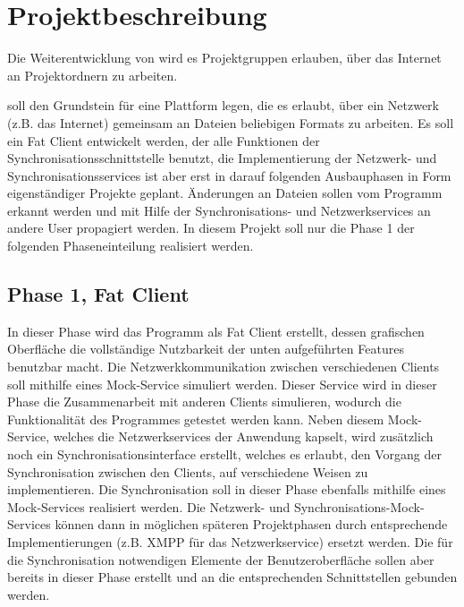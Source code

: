 
\section{Projektbeschreibung}
Die Weiterentwicklung von \sepmprojectname wird es Projektgruppen erlauben, über das Internet an Projektordnern zu arbeiten.

\sepmprojectname soll den Grundstein für eine Plattform legen, die es erlaubt, über ein Netzwerk (z.B. das Internet) gemeinsam an Dateien beliebigen Formats zu arbeiten. Es soll ein Fat Client entwickelt werden, der alle Funktionen der Synchronisationsschnittstelle benutzt, die Implementierung der Netzwerk- und Synchronisationsservices ist aber erst in darauf folgenden Ausbauphasen in Form eigenständiger Projekte geplant. Änderungen an Dateien sollen vom Programm erkannt werden und mit Hilfe der Synchronisations- und Netzwerkservices an andere User propagiert werden. In diesem Projekt soll nur die Phase 1 der folgenden Phaseneinteilung realisiert werden.

\subsection{Phase 1, Fat Client}
In dieser Phase wird das Programm als Fat Client erstellt, dessen grafischen Oberfläche die vollständige Nutzbarkeit der unten aufgeführten Features benutzbar macht. 
Die Netzwerkkommunikation zwischen verschiedenen Clients soll mithilfe eines Mock-Service simuliert werden. Dieser Service wird in dieser Phase die Zusammenarbeit mit anderen Clients simulieren, wodurch die Funktionalität des Programmes getestet werden kann. Neben diesem Mock-Service, welches die Netzwerkservices der Anwendung kapselt, wird zusätzlich noch ein Synchronisationsinterface erstellt, welches es erlaubt, den Vorgang der Synchronisation zwischen den Clients, auf verschiedene Weisen zu implementieren.
Die Synchronisation soll in dieser Phase ebenfalls mithilfe eines Mock-Services  realisiert werden. Die Netzwerk- und Synchronisations-Mock-Services können dann in möglichen späteren Projektphasen durch entsprechende Implementierungen (z.B. XMPP für das Netzwerkservice) ersetzt werden. Die für die Synchronisation notwendigen Elemente der Benutzeroberfläche sollen aber bereits in dieser Phase erstellt und an die entsprechenden Schnittstellen gebunden werden. 

